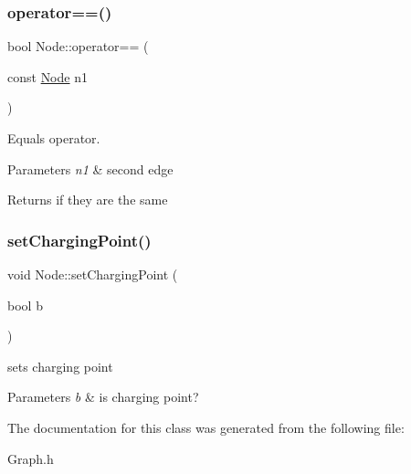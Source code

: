 \subsubsection{\texorpdfstring{operator==()}{operator==()}}
{\footnotesize\ttfamily bool Node\+::operator== (\begin{DoxyParamCaption}\item[{const \mbox{\hyperlink{class_node}{Node}}}]{n1 }\end{DoxyParamCaption})\hspace{0.3cm}{\ttfamily [inline]}}



Equals operator. 


\begin{DoxyParams}{Parameters}
{\em n1} & second edge \\
\hline
\end{DoxyParams}
\begin{DoxyReturn}{Returns}
if they are the same 
\end{DoxyReturn}
\mbox{\label{class_node_ad802c1308c34e4acd51938cf2d85eee8}} 
\subsubsection{\texorpdfstring{set\+Charging\+Point()}{setChargingPoint()}}
{\footnotesize\ttfamily void Node\+::set\+Charging\+Point (\begin{DoxyParamCaption}\item[{bool}]{b }\end{DoxyParamCaption})\hspace{0.3cm}{\ttfamily [inline]}}



sets charging point 


\begin{DoxyParams}{Parameters}
{\em b} & is charging point? \\
\hline
\end{DoxyParams}


The documentation for this class was generated from the following file\+:\begin{DoxyCompactItemize}
\item 
Graph.\+h\end{DoxyCompactItemize}
